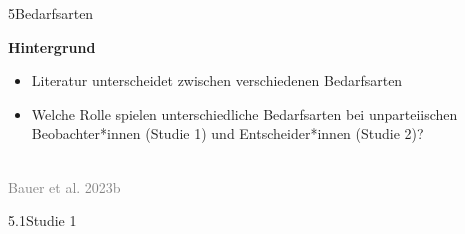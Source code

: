\documentclass[xcolor=table,9pt,aspectratio=169]{beamer}
\begin{document}
\begin{frame}{\vspace*{10mm}5\hspace*{1em}Bedarfsarten}
\begin{multicols}{2}
   \textbf{Hintergrund}\\
   \medskip
   \begin{itemize}
      \item Literatur unterscheidet zwischen verschiedenen Bedarfsarten
      \item Welche Rolle spielen unterschiedliche Bedarfsarten bei unparteiischen Beobachter*innen (Studie 1) und Entscheider*innen (Studie 2)?
   \end{itemize}
   \vfill
   \begin{center}
      \\
      \textcolor{gray}{Bauer et al. 2023b}
   \end{center}
\end{multicols}
\end{frame}


\begin{frame}
\begin{overlayarea}{\textwidth}{0.81\paperheight}{
   \vspace*{11mm}
   \textcolor{uolblue}
   {5.1\hspace*{1em}Studie 1}
}
\end{overlayarea}
\end{frame}
\end{document}
